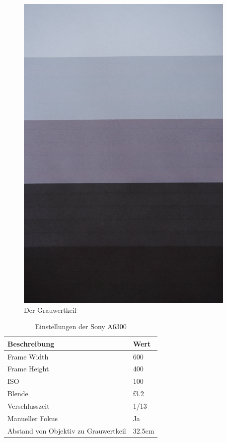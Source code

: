 \documentclass[12pt, oneside, a4paper, \docLanguage]{report}
\begin{document}
\begin{figure}[H]
	\centering\small
	\includegraphics[width=\textwidth, angle=90, scale=0.6]{media/original_versuch1.png}
	\caption{Der Grauwertkeil}
	\label{fig:VERSUCH_1_MESSWERTE_ORIGINAL}
\end{figure}

\begin{table}[H]
\centering\small
\begin{tabular}{|l|l|}
\hline
\textbf{Beschreibung}                & \textbf{Wert} \\ \hline
Frame Width							 & 600			 \\ \hline
Frame Height						 & 400			 \\ \hline
ISO                                  & 100           \\ \hline
Blende                               & f3.2          \\ \hline
Verschlusszeit                       & 1/13          \\ \hline
Manueller Fokus                      & Ja            \\ \hline
Abstand von Objektiv zu Grauwertkeil & 32.5cm        \\ \hline
\end{tabular}
\caption{Einstellungen der Sony A6300}
\label{fig:VERSUCH_1_MESSWERTE_TABELLE}
\end{table}
\newpage
\end{document}

